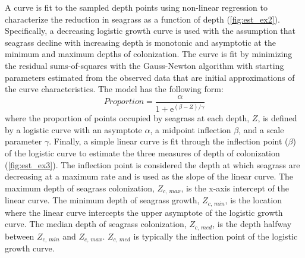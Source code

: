 \documentclass[letterpaper,12pt,oneside]{article}\usepackage[]{graphicx}\usepackage[]{color}
\begin{document}
A curve is fit to the sampled depth points using non-linear regression to characterize the reduction in seagrass as a function of depth (\cref{fig:est_ex2}).  Specifically, a decreasing logistic growth curve is used with the assumption that seagrass decline with increasing depth is monotonic and asymptotic at the minimum and maximum depths of colonization. The curve is fit by minimizing the residual sums-of-squares with the Gauss-Newton algorithm \citep{Bates92} with starting parameters estimated from the observed data that are initial approximations of the curve characteristics.  The model has the following form:
\begin{equation} \label{eqn:prop}
 Proportion = \frac{\alpha}{1 + \mathrm{e}^{{\left(\beta - Z\right)/\gamma}}}
\end{equation}
where the proportion of points occupied by seagrass at each depth, $Z$, is defined by a logistic curve with an asymptote $\alpha$, a midpoint inflection $\beta$, and a scale parameter $\gamma$.  Finally, a simple linear curve is fit through the inflection point ($\beta$) of the logistic curve to estimate the three measures of depth of colonization (\cref{fig:est_ex3}).  The inflection point is considered the depth at which seagrass are decreasing at a maximum rate and is used as the slope of the linear curve.  The maximum depth of seagrass colonization, $Z_{c,\,max}$, is the x-axis intercept of the linear curve.  The minimum depth of seagrass growth, $Z_{c,\,min}$, is the location where the linear curve intercepts the upper asymptote of the logistic growth curve.  The median depth of seagrass colonization, $Z_{c,\,med}$, is the depth halfway between $Z_{c,\,min}$ and $Z_{c,\,max}$.  $Z_{c,\,med}$ is typically the inflection point of the logistic growth curve.
\end{document}
